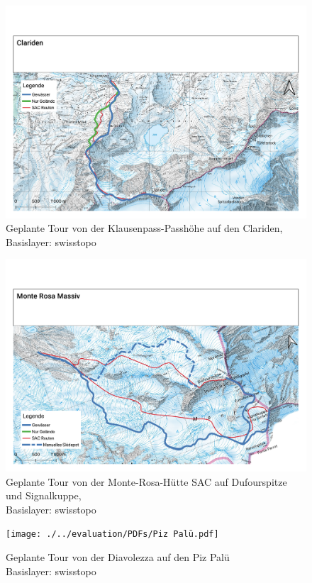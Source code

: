 \begin{multicols}{2}
\begin{Mappage}
{  \begin{figure}[H]
    \centering
    \includegraphics[page=1,width=.9\linewidth]{./../evaluation/PDFs/Clariden.pdf}
    \caption{Geplante Tour von der Klausenpass-Passhöhe auf den Clariden, \\Basislayer: swisstopo}\label{fig:clariden}
  \end{figure}
}

{%
    \begin{figure}[H]
      \centering
      \includegraphics[page=1,width=.9\linewidth]{./../evaluation/PDFs/Monte Rosa Massiv.pdf}
      \caption{Geplante Tour von der Monte-Rosa-Hütte SAC auf Dufourspitze und Signalkuppe,\\Basislayer: swisstopo}\label{fig:monterosa}
    \end{figure}
    \begin{figure}[H]
      \centering
      \texttt{[image: ./../evaluation/PDFs/Piz Palü.pdf]}
      \caption{Geplante Tour von der Diavolezza auf den Piz Palü\\Basislayer: swisstopo}\label{fig:pizpalu}
    \end{figure}
}
\end{Mappage}


\end{multicols}
